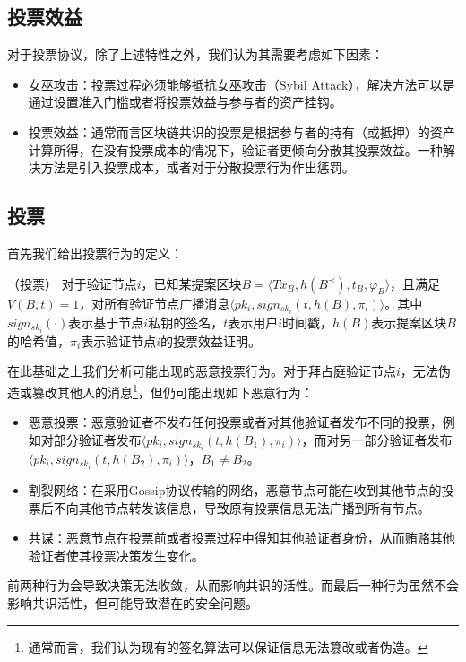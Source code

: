 \subsection{投票效益}
对于投票协议，除了上述特性之外，我们认为其需要考虑如下因素：
\begin{itemize}
	\item 女巫攻击：投票过程必须能够抵抗女巫攻击（Sybil Attack），解决方法可以是通过设置准入门槛或者将投票效益与参与者的资产挂钩。
	\item 投票效益：通常而言区块链共识的投票是根据参与者的持有（或抵押）的资产计算所得，在没有投票成本的情况下，验证者更倾向分散其投票效益。一种解决方法是引入投票成本，或者对于分散投票行为作出惩罚\cite{buterin2017casper}。	
\end{itemize}

\subsection{投票}
首先我们给出投票行为的定义：
\begin{definition}
（投票） 对于验证节点$i$，已知某提案区块$B=\langle Tx_B,h(B^\prec),t_B,\varphi_B \rangle$，且满足$V(B,t)=1$，对所有验证节点广播消息$\langle pk_i,sign_{sk_i}(t,h(B),\pi_i) \rangle$。其中$sign_{sk_i}(\cdot)$表示基于节点$i$私钥的签名，$t$表示用户$i$时间戳，$h(B)$表示提案区块$B$的哈希值，$\pi_i$表示验证节点$i$的投票效益证明。
\end{definition}

在此基础之上我们分析可能出现的恶意投票行为。对于拜占庭验证节点$i$，无法伪造或篡改其他人的消息\footnote{通常而言，我们认为现有的签名算法可以保证信息无法篡改或者伪造。}，但仍可能出现如下恶意行为：

\begin{itemize}
	\item 恶意投票：恶意验证者不发布任何投票或者对其他验证者发布不同的投票，例如对部分验证者发布$\langle pk_i,sign_{sk_i}(t,h(B_1),\pi_i) \rangle$，而对另一部分验证者发布$\langle pk_i,sign_{sk_i}(t,h(B_2),\pi_i) \rangle$，$B_1 \neq B_2$。
	\item 割裂网络：在采用Gossip协议传输的网络，恶意节点可能在收到其他节点的投票后不向其他节点转发该信息，导致原有投票信息无法广播到所有节点。
	\item 共谋：恶意节点在投票前或者投票过程中得知其他验证者身份，从而贿赂其他验证者使其投票决策发生变化。
\end{itemize}

前两种行为会导致决策无法收敛，从而影响共识的活性。而最后一种行为虽然不会影响共识活性，但可能导致潜在的安全问题。




